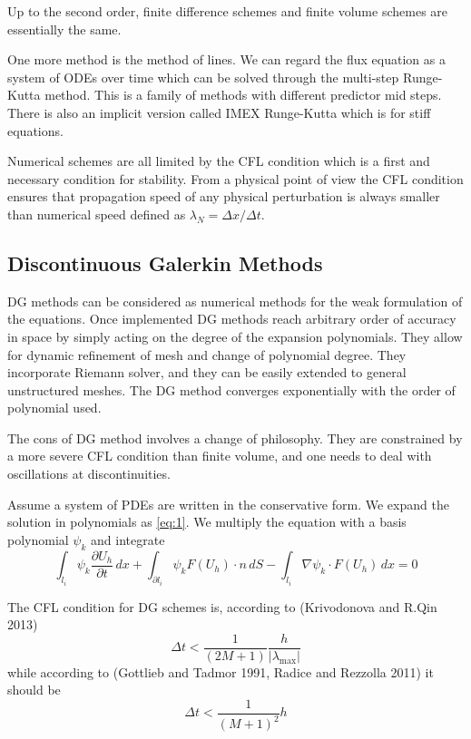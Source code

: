\documentclass[letterpaper, 11pt]{article}
\numberwithin{equation}{section}
\numberwithin{figure}{section}
\begin{document}
Up to the second order, finite difference schemes and finite volume schemes are
essentially the same.

One more method is the method of lines. We can regard the flux equation as a
system of ODEs over time which can be solved through the multi-step Runge-Kutta
method. This is a family of methods with different predictor mid steps. There is
also an implicit version called IMEX Runge-Kutta which is for stiff equations.

Numerical schemes are all limited by the CFL condition which is a first and
necessary condition for stability. From a physical point of view the CFL
condition ensures that propagation speed of any physical perturbation is always
smaller than numerical speed defined as $\lambda_N = \Delta x/\Delta t$.

\subsection{Discontinuous Galerkin Methods}

DG methods can be considered as numerical methods for the weak formulation of
the equations. Once implemented DG methods reach arbitrary order of accuracy in
space by simply acting on the degree of the expansion polynomials. They allow
for dynamic refinement of mesh and change of polynomial degree. They incorporate
Riemann solver, and they can be easily extended to general unstructured meshes.
The DG method converges exponentially with the order of polynomial used.

The cons of DG method involves a change of philosophy. They are constrained by a
more severe CFL condition than finite volume, and one needs to deal with
oscillations at discontinuities.

Assume a system of PDEs are written in the conservative form. We expand the
solution in polynomials as \eqref{eq:1}. We multiply the equation with a basis
polynomial $\psi_k$ and integrate
\begin{equation}
  \label{eq:9}
  \int_{l_i}\psi_k\frac{\partial U_h}{\partial t}\,dx + \int_{\partial l_i} \psi_kF(U_h)\cdot n\,dS - \int_{l_i}\nabla\psi_k\cdot F(U_h)\,dx = 0
\end{equation}


The CFL condition for DG schemes is, according to (Krivodonova and R.Qin 2013)
\begin{equation}
  \label{eq:5}
  \Delta t < \frac{1}{(2M + 1)}\frac{h}{\left| \lambda_\mathrm{max} \right|}
\end{equation}
while according to (Gottlieb and Tadmor 1991, Radice and Rezzolla 2011) it
should be
\begin{equation}
  \label{eq:6}
  \Delta t < \frac{1}{(M + 1)^2}h
\end{equation}
\end{document}
